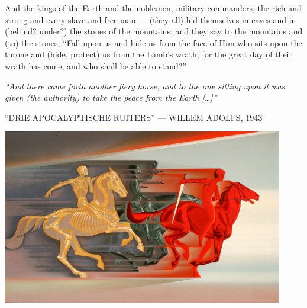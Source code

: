 \begin{pages}
\begin{Leftside}
		\pend
		\pstart
		And the kings of the Earth and the noblemen, military commanders, the rich and strong and every slave and free man — (they all) hid themselves in caves and in (behind? under?) the stones of the mountains; and they say to the mountains and (to) the stones, “Fall upon us and hide us from the face of Him who sits upon the throne and (hide, protect) us from the Lamb’s wrath; for the great day of their wrath has come, and who shall be able to stand?”
		\pend
        \endnumbering
    \end{Leftside}

\end{pages} 
\Pages

\clearpage
\thispagestyle{empty}
\null\vfill
\settowidth{}
\begin{center}
\parbox{\longest}{%
  \raggedright{\huge\itshape%
    ``And there came forth another fiery horse, and to the one sitting upon it was given (the authority) to take the peace from the Earth […]'' \par\bigskip
  }
  \raggedleft\Large\MakeUppercase{``Drie apocalyptische ruiters'' — Willem Adolfs, 1943}\par%
}
\vfill\vfill
\clearpage\newpage
\end{center}
\newpage
\thispagestyle{empty}
\begin{center}
	\includegraphics[angle=90, width=0.92\textwidth]{images/illustrations/adolfshorsemen.jpg}
\end{center}